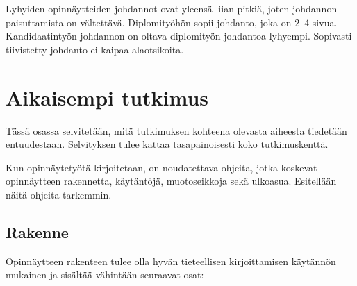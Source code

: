 \documentclass[finnish, 12pt, a4paper, elec, utf8, a-1b, online]{aaltothesis}
\begin{document}
Lyhyiden opinnäytteiden johdannot ovat yleensä liian pitkiä, joten johdannon
paisuttamista on vältettävä. Diplomityöhön sopii johdanto, joka on 2--4 sivua.
Kandidaatintyön johdannon on oltava diplomityön johdantoa lyhyempi. Sopivasti
tiivistetty johdanto ei kaipaa alaotsikoita.


\clearpage

\section{Aikaisempi tutkimus}

Tässä osassa selvitetään, mitä tutkimuksen kohteena olevasta aiheesta tiedetään
entuudestaan. Selvityksen tulee kattaa tasapainoisesti koko tutkimuskenttä.

Kun opinnäytetyötä kirjoitetaan, on noudatettava ohjeita, jotka koskevat
opinnäytteen rakennetta, käytäntöjä, muotoseikkoja sekä ulkoasua. Esitellään
näitä ohjeita tarkemmin.


\subsection*{Rakenne}

Opinnäytteen rakenteen tulee olla hyvän tieteellisen kirjoittamisen käytännön
mukainen ja sisältää vähintään seuraavat osat:
\end{document}
